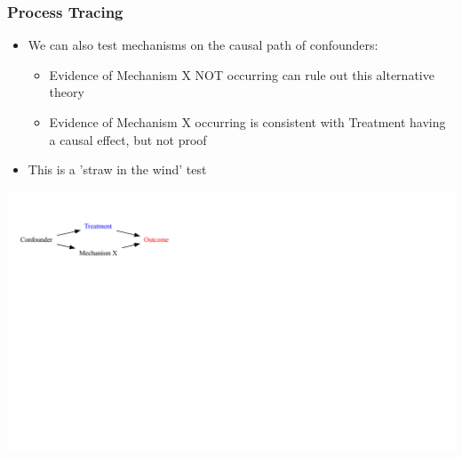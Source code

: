 \documentclass[xcolor=x11names,compress]{beamer}\usepackage[]{graphicx}\usepackage[]{color}
\newenvironment{knitrout}{}{} %
\renewcommand{\(}{\begin{columns}}
\renewcommand{\)}{\end{columns}}
\newcommand{\<}[1]{\begin{column}{#1}}
\renewcommand{\>}{\end{column}}
\begin{document}
\begin{frame}
\frametitle{Process Tracing}
\begin{itemize}
\item We can also test mechanisms on the causal path of confounders:
\pause
\begin{itemize}
\item Evidence of Mechanism X NOT occurring can rule out this alternative theory
\pause
\item Evidence of Mechanism X occurring is consistent with Treatment having a causal effect, but not proof
\pause
\end{itemize}
\item This is a 'straw in the wind' test
\end{itemize}
\begin{knitrout}
\color{fgcolor}
\includegraphics[width=1.8\linewidth]{figure/Dag4-1} 

\end{knitrout}
\end{frame}
\end{document}
